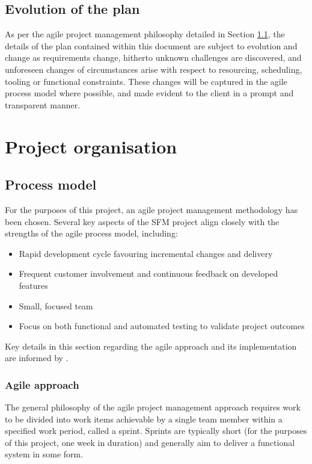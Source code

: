 \documentclass[12pt]{article}
\begin{document}
\subsection{Evolution of the plan}
As per the agile project management philosophy detailed in Section \ref{procmodel}, the details of the plan contained within this document are subject to evolution and change as requirements change, hitherto unknown challenges are discovered, and unforeseen changes of circumstances arise with respect to resourcing, scheduling, tooling or functional constraints. These changes will be captured in the agile process model where possible, and made evident to the client in a prompt and transparent manner.


\section{Project organisation}\label{funcrec}
\subsection{Process model}\label{procmodel}

For the purposes of this project, an agile project management methodology has been chosen. Several key aspects of the SFM project align closely with the strengths of the agile process model, including:
\begin{itemize}{}
\item Rapid development cycle favouring incremental changes and delivery
\item Frequent customer involvement and continuous feedback on developed features
\item Small, focused team
\item Focus on both functional and automated testing to validate project outcomes
\end{itemize}

Key details in this section regarding the agile approach and its implementation are informed by \cite{sommerville}.

\subsubsection{Agile approach}
The general philosophy of the agile project management approach requires work to be divided into work items achievable by a single team member within a specified work period, called a sprint. Sprints are typically short (for the purposes of this project, one week in duration) and generally aim to deliver a functional system in some form. 
\end{document}
